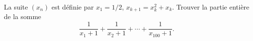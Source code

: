 La suite $(x_n)$ est définie par $x_1 = 1/2$, $x_{k+1} = x_k^2 + x_k$. Trouver la partie entière de la somme
\[ \frac{1}{x_1 + 1} + \frac{1}{x_2 + 1} + \cdots + \frac{1}{x_{100} + 1}. \]
